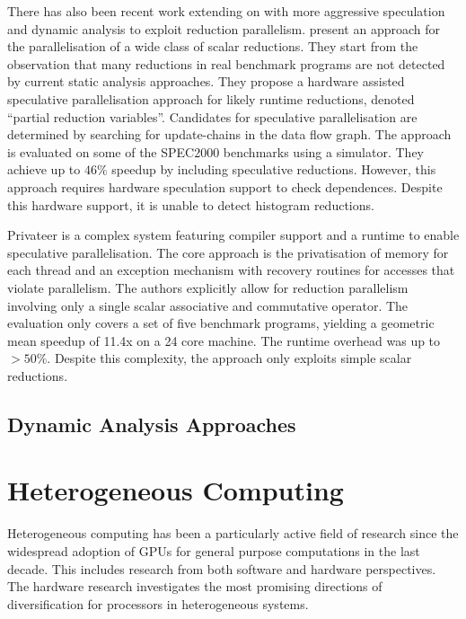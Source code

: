     There has also been recent work extending on \citet{rauchwerger1999lrpd}
    with more aggressive speculation and dynamic analysis
    \citep{aguilar2015unified} to exploit reduction parallelism.
    \citet{Han2010Speculative} present an approach for the
    parallelisation of a wide class of scalar reductions.
    They start from the observation that many reductions in real benchmark
    programs are not detected by current static analysis approaches.
    They propose a hardware assisted speculative parallelisation approach for
    likely runtime reductions, denoted ``partial reduction variables''.
    Candidates for speculative parallelisation are determined by searching for
    update-chains in the data flow graph.
    The approach is evaluated on some of the SPEC2000 benchmarks using a
    simulator.
    They achieve up to $46\%$ speedup by including speculative reductions.
    However, this approach requires hardware speculation support to check
    dependences.
    Despite this hardware support, it is unable to detect histogram reductions.

    Privateer \citep{Johnson:2012:SSP:2254064.2254107} is a complex system
    featuring compiler support and a runtime to enable speculative
    parallelisation.
    The core approach is the privatisation of memory for each thread and an
    exception mechanism with recovery routines for accesses that violate
    parallelism.
    The authors explicitly allow for reduction parallelism involving only a
    single scalar associative and commutative operator.
    The evaluation only covers a set of five benchmark programs, yielding
    a geometric mean speedup of 11.4x on a 24 core machine.
    The runtime overhead was up to $>50\%$.
    Despite this complexity, the approach only exploits simple scalar reductions.

\subsection{Dynamic Analysis Approaches}


\pagebreak
\section{Heterogeneous Computing}

    Heterogeneous computing has been a particularly active field of research
    since the widespread adoption of GPUs for general purpose computations in
    the last decade.
    This includes research from both software and hardware perspectives.
    The hardware research investigates the most promising directions of
    diversification for processors in heterogeneous systems.
    
